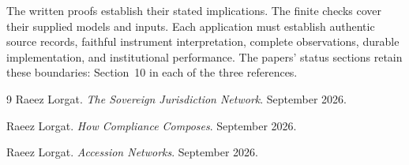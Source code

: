 \documentclass{momentum}
\begin{document}
The written proofs establish their stated implications.
The finite checks cover their supplied models and inputs.
Each application must establish authentic source records, faithful instrument interpretation, complete observations, durable implementation, and institutional performance.
The papers' status sections retain these boundaries: Section~10 in each of the three references.

\begin{thebibliography}{9}
Raeez Lorgat.
\emph{The Sovereign Jurisdiction Network}.
September 2026.

Raeez Lorgat.
\emph{How Compliance Composes}.
September 2026.

Raeez Lorgat.
\emph{Accession Networks}.
September 2026.
\end{thebibliography}
\end{document}
